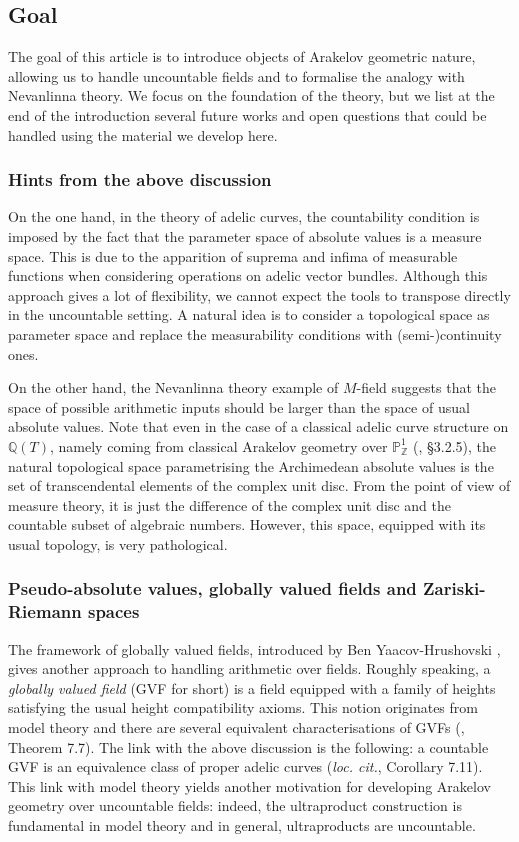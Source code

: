 \documentclass [11pt,reqno]{amsart}
\def\bQ{{\mathbb{Q}}}
\def\bZ{{\mathbb{Z}}}
\newcommand{\1}{\mathmybb{1}}
\begin{document}
\subsection*{Goal}

The goal of this article is to introduce objects of Arakelov geometric nature, allowing us to handle uncountable fields and to formalise the analogy with Nevanlinna theory. We focus on the foundation of the theory, but we list at the end of the introduction several future works and open questions that could be handled using the material we develop here.

\subsubsection*{Hints from the above discussion}
On the one hand, in the theory of adelic curves, the countability condition is imposed by the fact that the parameter space of absolute values is a measure space. This is due to the apparition of suprema and infima of measurable functions when considering operations on adelic vector bundles. Although this approach gives a lot of flexibility, we cannot expect the tools to transpose directly in the uncountable setting. A natural idea is to consider a topological space as parameter space and replace the measurability conditions with (semi-)continuity ones. 

On the other hand, the Nevanlinna theory example of $M$-field suggests that the space of possible arithmetic inputs should be larger than the space of usual absolute values. Note that even in the case of a classical adelic curve structure on $\bQ(T)$, namely coming from classical Arakelov geometry over $\mathbb{P}^{1}_{\bZ}$ (\cite{ChenMori}, \S 3.2.5), the natural topological space parametrising the Archimedean absolute values is the set of transcendental elements of the complex unit disc. From the point of view of measure theory, it is just the difference of the complex unit disc and the countable subset of algebraic numbers. However, this space, equipped with its usual topology, is very pathological.

\subsubsection*{Pseudo-absolute values, globally valued fields and Zariski-Riemann spaces}

The framework of globally valued fields, introduced by Ben Yaacov-Hrushovski \cite{Hrushovski16}, gives another approach to handling arithmetic over fields. Roughly speaking, a \emph{globally valued field} (GVF for short) is a field equipped with a family of heights satisfying the usual height compatibility axioms. This notion originates from model theory and there are several equivalent characterisations of GVFs (\cite{GVF24}, Theorem 7.7). The link with the above discussion is the following: a countable GVF is an equivalence class of proper adelic curves (\emph{loc. cit.}, Corollary 7.11). This link with model theory yields another motivation for developing Arakelov geometry over uncountable fields: indeed, the ultraproduct construction is fundamental in model theory and in general, ultraproducts are uncountable.   
\end{document}

